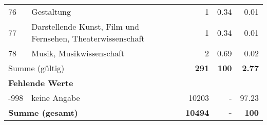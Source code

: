\begin{longtable}{lXrrr}
        76 & \multicolumn{1}{X}{Gestaltung} & %
          \num{1} &
          \num[round-mode=places,round-precision=2]{0.34} &
          \num[round-mode=places,round-precision=2]{0.01} \\

        77 & \multicolumn{1}{X}{Darstellende Kunst, Film und Fernsehen, Theaterwissenschaft} & %
          \num{1} &
          \num[round-mode=places,round-precision=2]{0.34} &
          \num[round-mode=places,round-precision=2]{0.01} \\

        78 & \multicolumn{1}{X}{Musik, Musikwissenschaft} & %
          \num{2} &
          \num[round-mode=places,round-precision=2]{0.69} &
          \num[round-mode=places,round-precision=2]{0.02} \\

     \midrule
     \multicolumn{2}{l}{Summe (gültig)} &
       \textbf{\num{291}} &
     \textbf{\num{100}} &
       \textbf{\num[round-mode=places,round-precision=2]{2.77}} \\
     \multicolumn{5}{l}{\textbf{Fehlende Werte}}\\
       -998 &
       keine Angabe &
         \num{10203} &
        - &
         \num[round-mode=places,round-precision=2]{97.23} \\
     \midrule
     \multicolumn{2}{l}{\textbf{Summe (gesamt)}} &
          \textbf{\num{10494}} &
        \textbf{-} &
        \textbf{\num{100}} \\
     \bottomrule
     \end{longtable}
     
